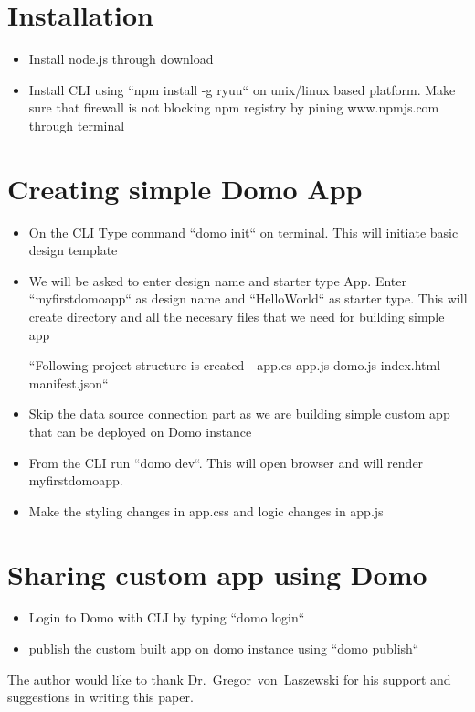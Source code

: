 \section{Installation}
\begin{itemize}
\item Install node.js through download
\item Install CLI using ``npm install -g ryuu`` on unix/linux based platform. 
   Make sure that firewall is not blocking npm registry by pining
   www.npmjs.com through terminal
\end{itemize}


\section{Creating simple Domo App}
\begin{itemize}
\item On the CLI Type command  ``domo init`` on terminal.
   This will initiate basic design template
\item We will be asked to enter design name and starter type App. 
   Enter ``myfirstdomoapp`` as design name and ``HelloWorld`` as 
   starter type. This will create directory and all the necesary
   files that we need for building simple app

      ``Following project structure is created -
        app.cs
        app.js
        domo.js
        index.html
        manifest.json``~\cite{hid-sp18-523-Dev}

\item Skip the data source connection part as we are building simple
   custom app that can be deployed on Domo instance
\item From the CLI run ``domo dev``. This will open browser and will 
   render myfirstdomoapp.
\item Make the styling changes in app.css and logic changes in app.js

\end{itemize}


\section{Sharing custom app using Domo}
\begin{itemize}
\item Login to Domo with CLI by typing ``domo login``
\item publish the custom built app on domo instance
   using ``domo publish``
\end{itemize}

\begin{acks}

The author would like to thank Dr.~Gregor~von~Laszewski 
for his support and suggestions in writing this paper.
\end{acks}


 


